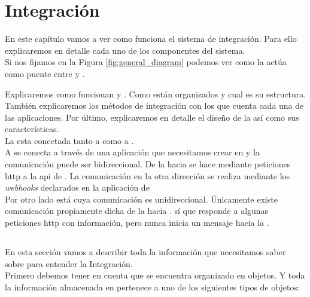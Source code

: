 
\chapter{Integración}

En este capítulo vamos a ver como funciona el sistema de integración. Para ello explicaremos en detalle cada uno de los componentes del sistema.\\

Si nos fijamos en la Figura \ref{fig:general_diagram} podemos ver como la \iface{} actúa como puente entre \hs{} y \wday{}. 



Explicaremos como funcionan \hs{} y \wday{}. Como están organizados y cual es su estructura. También explicaremos los métodos de integración con los que cuenta cada una de las aplicaciones.
Por último, explicaremos en detalle el diseño de la \iface{} así como sus características.\\

La \iface{} esta conectada tanto a \hs{} como a \wday{}.\\ 

A \hs{} se conecta a través de una aplicación que necesitamos crear en \hs{} y la comunicación  puede ser bidireccional. De la \iface{} hacia \hs{} se hace mediante peticiones \acrshort{http} a la \acrshort{api} de \hs{}. 
La comunicación en la otra dirección se realiza mediante los \textit{webhooks} declarados en la aplicación de \hs{}\\

Por otro lado está \wday{} cuya comunicación es unidireccional. Únicamente existe comunicación propiamente dicha de la \iface{} hacia \wday. \wday{} sí que responde a algunas peticiones \acrshort{http} con información, pero nunca inicia un mensaje hacia la \iface.

\section{\hs{}}
En esta sección vamos a describir toda la información que necesitamos saber sobre \hs{} para entender la Integración.\\

Primero debemos tener en cuenta que \hs{} se encuentra organizado en objetos. Y toda la información almacenada en \hs{} pertenece a uno de los siguientes tipos de objetos:

